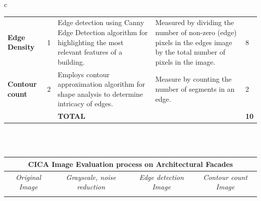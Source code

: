 \documentclass[final,5p,times]{elsarticle}
\begin{document}
\begin{table}[!htb]
\begin{tabular}{c}
\begin{minipage}{\textwidth}
\begin{tabularx}{\textwidth}{p{2.5cm} p{1cm} X X p{1cm}}
            \textbf{Edge Density} &
              1 &
              Edge detection using Canny Edge Detection algorithm for highlighting the most relevant features of a building.
                &
              Measured by dividing the number of non-zero (edge) pixels in the edges image by the total number of pixels in the image.
                &
              8\\
            \textbf{Contour count} &
              2 &
              Employs contour approximation algorithm for shape analysis to determine intricacy of edges.
                &
              Measure by counting the number of segments in an edge.
                &
              2\\ \bottomrule
               &
               &
              \textbf{TOTAL} &
              &
              \textbf{10}\\ \bottomrule
        \end{tabularx}
    \end{minipage}
    \\
    \\
    \begin{minipage}{\textwidth}
        \centering
        \label{tab:CICAPlotMaster}
        \begin{tabularx}
        {\textwidth}{X X X X }
            \toprule
            \multicolumn{4}{c}{\textbf{CICA Image Evaluation process on Architectural Facades}} \\
            \toprule
            \multicolumn{1}{c}{\textit{Original Image}} &
             \multicolumn{1}{c}{\textit{Grayscale, noise reduction}} &
            \multicolumn{1}{c}{\textit{Edge detection Image}} &
            \multicolumn{1}{c}{\textit{Contour count Image}}\\
            \midrule
            \text{(a) 3D-modeled facades} &  &  &
            \\

\end{tabularx}
\end{minipage}
\end{tabular}
\end{table}
\end{document}
